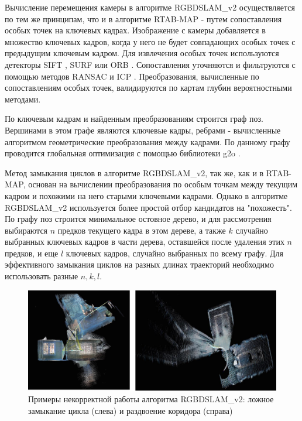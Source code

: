 \documentclass{mipt-thesis-ms}
\begin{document}
	Вычисление перемещения камеры в алгоритме RGBDSLAM\_v2 осуществляется по тем же принципам, что и в алгоритме RTAB-MAP - путем сопоставления особых точек на ключевых кадрах. Изображение с камеры добавляется в множество ключевых кадров, когда у него не будет совпадающих особых точек с предыдущим ключевым кадром. Для извлечения особых точек используются детекторы SIFT \cite{lowe2004distinctive}, SURF \cite{bay2006surf} или ORB \cite{rublee2011orb}. Сопоставления уточняются и фильтруются с помощью методов RANSAC \cite{brachmann2017dsac} и ICP \cite{chetverikov2005robust}. Преобразования, вычисленные по сопоставлениям особых точек, валидируются по картам глубин вероятностными методами.
	
	По ключевым кадрам и найденным преобразованиям строится граф поз. Вершинами в этом графе являются ключевые кадры, ребрами - вычисленные алгоритмом геометрические преобразования между кадрами. По данному графу проводится глобальная оптимизация с помощью библиотеки g2o \cite{grisetti2011g2o}.
	
	Метод замыкания циклов в алгоритме RGBDSLAM\_v2, так же, как и в RTAB-MAP, основан на вычислении преобразования по особым точкам между текущим кадром и похожими на него старыми ключевыми кадрами. Однако в алгоритме RGBDSLAM\_v2 используется более простой отбор кандидатов на "похожесть". По графу поз строится минимальное остовное дерево, и для рассмотрения выбираются $n$ предков текущего кадра в этом дереве, а также $k$ случайно выбранных ключевых кадров в части дерева, оставшейся после удаления этих $n$ предков, и еще $l$ ключевых кадров, случайно выбранных по всему графу. Для эффективного замыкания циклов на разных длинах траекторий необходимо использовать разные $n, k, l$.
	
	\begin{figure}
		\includegraphics[width=1.0\textwidth]{img/rgbdslam_fails.png}
		\caption{Примеры некорректной работы алгоритма RGBDSLAM\_v2: ложное замыкание цикла (слева) и раздвоение коридора (справа)}
		\label{figure_rgbdslam_fails}
	\end{figure}
	
\end{document}
